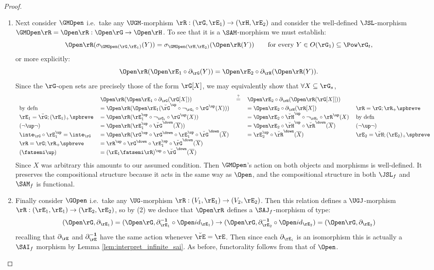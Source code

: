 \documentclass{article}
\begin{document}
\begin{proof}
\begin{enumerate}
\item
Next consider $\GMOpen$ i.e.\ take any $\UGM$-morphism $\rR : (\rG,\rE_1) \to (\rH,\rE_2)$ and consider the well-defined $\JSL$-morphism $\GMOpen\rR = \Open\rR : \Open\rG \to \Open\rH$. To see that it is a $\SAM$-morphism we must establish:
\[
\Open\rR(\sigma_{\GMOpen(\rG,\rE_1)}(Y))
= \sigma_{\GMOpen(\rH,\rE_2)}(\Open\rR(Y))
\qquad
\text{for every $Y \in O(\rG_1) \subseteq \Pow\rG_t$},
\]
or more explicitly:
\[
\Open\rR(\Open\rE_1 \circ \partial_\rG(Y))
=
\Open\rE_2 \circ \partial_\rH(\Open\rR(Y)).
\]
Since the $\rG$-open sets are precisely those of the form $\rG[X]$, we may equivalently show that $\forall X \subseteq \rG_s$,
\[
\begin{tabular}{lllll}
&
$\Open\rR(\Open\rE_1 \circ \partial_\rG(\rG[X]))$
& $\stackrel{?}{=}$ &
$\Open\rE_2 \circ \partial_\rH(\Open\rR(\rG[X]]))$
&
\\
by defn &
$= \Open\rR(\Open\rE_1( \breve{\rG}^\up \circ \neg_{\rG_t} \circ \rG^\up(X)))$
&&
$= \Open\rE_2 \circ \partial_\rH(\rR[X])$
& $\rR = \rG ; \rR_+\spbreve$
\\
$\rE_1 = \breve{\rG};(\rE_1)_+\spbreve$  & 
$= \Open\rR(\rE_1^\up \circ  \neg_{\rG_t} \circ \rG^\up(X))$
&&
$= \Open\rE_2 \circ \breve{\rH}^\up \circ \neg_{\rH_t} \circ \rR^\up(X)$
& by defn
\\
$(\neg\up\neg)$ & 
$= \Open\rR(\rE_1^\up \circ \breve{\rG}^\down(\overline{X}))$
&&
$= \Open\rE_2 \circ \breve{\rH}^\up \circ \breve{\rR}^\down(\overline{X})$
& $(\neg\up\neg)$
\\
$\inte_\rG \circ \rE_1^\up  = \inte_\rG$ &
$= \Open\rR(\rG^\up \circ \rG^\down \circ \rE_1^\up \circ \breve{\rG}^\down(\overline{X})$
&&
$= \rE_2^\up \circ \breve{\rR}^\down(\overline{X})$
& $\rE_2 = \breve{\rH} ; (\rE_2)_+\spbreve$
\\
$\rR = \rG ; \rR_+\spbreve$ &
$= \rR^\up \circ \rG^\down \circ \rE_1^\up \circ \breve{\rG}^\down(\overline{X})$
&&
\\
$(\fatsemi\up)$ &
$= (\rE_1 \fatsemi \rR)^\up \circ \breve{\rG}^\down(\overline{X})$
&&
\end{tabular}
\]
Since $X$ was arbitrary this amounts to our assumed condition. Then $\GMOpen$'s action on both objects and morphisms is well-defined. It preserves the compositional structure because it acts in the same way as $\Open$, and the compositional structure in both $\JSL_f$ and $\SAM_f$ is functional.

\smallskip
\item
Finally consider $\GOpen$ i.e.\ take any $\UG$-morphism $\rR : (V_1,\rE_1) \to (V_2,\rE_2)$. Then this relation defines a $\UGJ$-morphism $\rR : (\rE_1,\rE_1) \to (\rE_2,\rE_2)$, so by (2) we deduce that $\Open\rR$ defines a $\SAJ_f$-morphism of type:
\[
(\Open\rG,\partial_{\rE_1}) 
= (\Open\rG,\partial_{\rE_1}^{\bf-1} \circ \Open id_{\rE_1})
\to 
(\Open\rG,\partial_{\rE_2}^{\bf-1} \circ \Open id_{\rE_2})
= (\Open\rG,\partial_{\rE_2}) 
\]
recalling that $\partial_\rE$ and $\partial_\rE^{\bf-1}$ have the same action whenever $\breve{\rE} = \rE$. Then since each $\partial_{\rE_i}$ is an isomorphism this is actually a $\SAI_f$ morphism by Lemma \ref{lem:interpret_infinite_sai}. As before, functorality follows from that of $\Open$.


\end{enumerate}
\end{proof}
\end{document}
